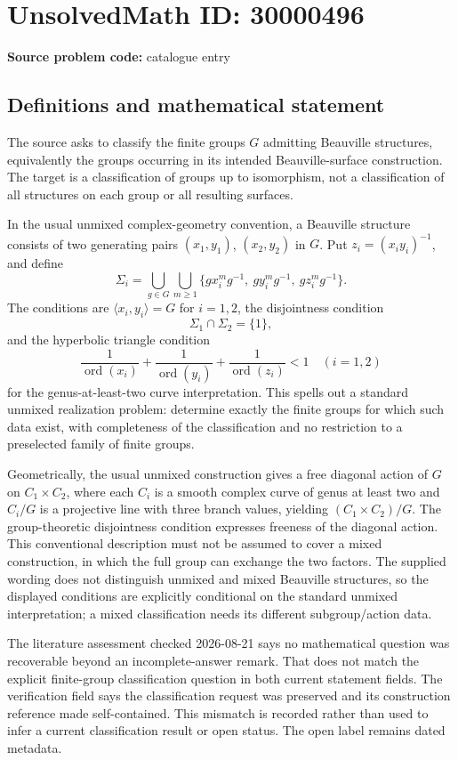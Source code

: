 \documentclass[11pt]{article}
\begin{document}
\section*{UnsolvedMath ID: 30000496}
\textbf{Source problem code:} catalogue entry
\subsection{Definitions and mathematical statement}
The source asks to classify the finite groups \(G\) admitting Beauville structures, equivalently the groups occurring in its intended Beauville-surface construction. The target is a classification of groups up to isomorphism, not a classification of all structures on each group or all resulting surfaces.

In the usual unmixed complex-geometry convention, a Beauville structure consists of two generating pairs \((x_1,y_1)\), \((x_2,y_2)\) in \(G\). Put \(z_i=(x_iy_i)^{-1}\), and define
\[
 \Sigma_i=\bigcup_{g\in G}\bigcup_{m\geq1}
 \{gx_i^mg^{-1},\ gy_i^mg^{-1},\ gz_i^mg^{-1}\}.
\]
The conditions are \(\langle x_i,y_i\rangle=G\) for \(i=1,2\), the disjointness condition
\[
 \Sigma_1\cap\Sigma_2=\{1\},
\]
and the hyperbolic triangle condition
\[
 \frac1{\operatorname{ord}(x_i)}+
 \frac1{\operatorname{ord}(y_i)}+
 \frac1{\operatorname{ord}(z_i)}<1\quad(i=1,2)
\]
for the genus-at-least-two curve interpretation. This spells out a standard unmixed realization problem: determine exactly the finite groups for which such data exist, with completeness of the classification and no restriction to a preselected family of finite groups.

Geometrically, the usual unmixed construction gives a free diagonal action of \(G\) on \(C_1\times C_2\), where each \(C_i\) is a smooth complex curve of genus at least two and \(C_i/G\) is a projective line with three branch values, yielding \((C_1\times C_2)/G\). The group-theoretic disjointness condition expresses freeness of the diagonal action. This conventional description must not be assumed to cover a mixed construction, in which the full group can exchange the two factors. The supplied wording does not distinguish unmixed and mixed Beauville structures, so the displayed conditions are explicitly conditional on the standard unmixed interpretation; a mixed classification needs its different subgroup/action data.

The literature assessment checked 2026-08-21 says no mathematical question was recoverable beyond an incomplete-answer remark. That does not match the explicit finite-group classification question in both current statement fields. The verification field says the classification request was preserved and its construction reference made self-contained. This mismatch is recorded rather than used to infer a current classification result or open status. The open label remains dated metadata.
\end{document}
